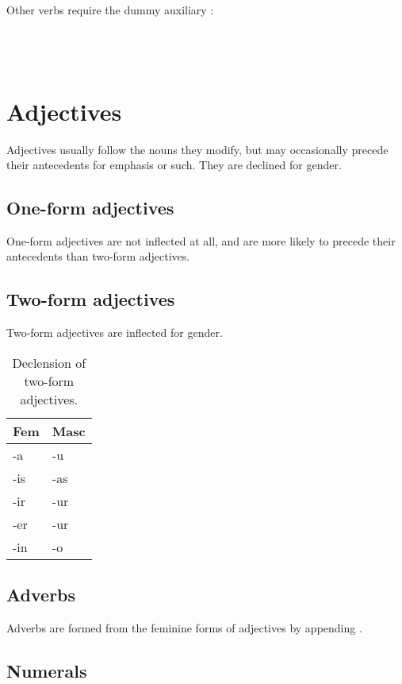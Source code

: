 \documentclass{book}
\begin{document}
Other verbs require the dummy auxiliary : \\
~\\
   \\
   \\
 

\chapter{Adjectives}

Adjectives usually follow the nouns they modify, but may occasionally precede their antecedents for emphasis or such. They are declined for gender.

\section{One-form adjectives}

One-form adjectives are not inflected at all, and are more likely to precede their antecedents than two-form adjectives.

\section{Two-form adjectives}

Two-form adjectives are inflected for gender.

\begin{table}[h]
  \caption{Declension of two-form adjectives.}
  \centering
  \begin{tabular}{ll}
    Fem & Masc \\
    \hline
    -a & -u \\
    -is & -as \\
    -ir & -ur \\
    -er & -ur \\
    -in & -o \\
  \end{tabular}
\end{table}

\section{Adverbs}

Adverbs are formed from the feminine forms of adjectives by appending .

\section{Numerals}
\end{document}
